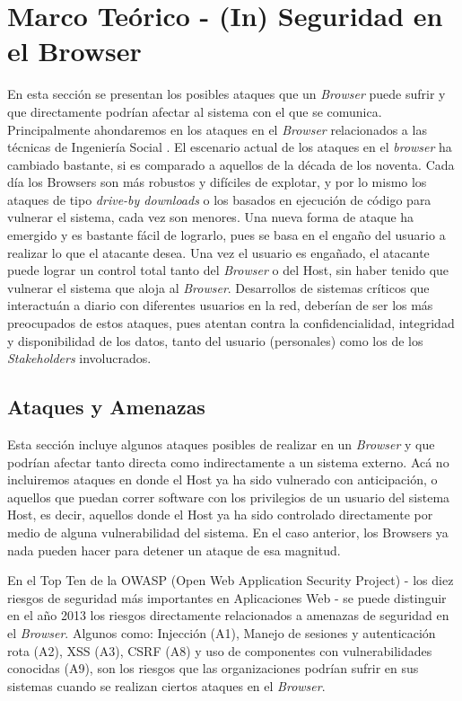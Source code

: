 \chapter{Marco Teórico - (In) Seguridad en el Browser}
\label{chap3:MT}


En esta sección se presentan los posibles ataques que un \textit{Browser} puede sufrir y que directamente podrían afectar al sistema con el que se comunica. Principalmente ahondaremos en los ataques en el \textit{Browser} relacionados a las técnicas de Ingeniería Social \cite{socEngineeering}. El escenario actual de los ataques en el \textit{browser} ha cambiado bastante, si es comparado a aquellos de la década de los noventa. Cada día los Browsers son más robustos y difíciles de explotar, y por lo mismo los ataques de tipo \textit{drive-by downloads} o los basados en ejecución de código para vulnerar el sistema, cada vez son menores. Una nueva forma de ataque ha emergido y es bastante fácil de lograrlo, pues se basa en el engaño del usuario a realizar lo que el atacante desea. Una vez el usuario es engañado, el atacante puede lograr un control total tanto del \textit{Browser} o del Host, sin haber tenido que vulnerar el sistema \cite{Rajab2013,Labs2013} que aloja al \textit{Browser}. Desarrollos de sistemas críticos que interactuán a diario con diferentes usuarios en la red, deberían de ser los más preocupados de estos ataques, pues atentan contra la confidencialidad, integridad y disponibilidad de los datos, tanto del usuario (personales) como los de los \textit{Stakeholders} involucrados.

\section{Ataques y Amenazas}
Esta sección incluye algunos ataques posibles de realizar en un \textit{Browser} y que podrían afectar tanto directa como indirectamente a un sistema externo. Acá no incluiremos ataques en donde el Host ya ha sido vulnerado con anticipación, o aquellos que puedan correr software con los privilegios de un usuario del sistema Host, es decir, aquellos donde el Host ya ha sido controlado directamente por medio de alguna vulnerabilidad del sistema. En el caso anterior, los Browsers ya nada pueden hacer para detener un ataque de esa magnitud.

En el Top Ten \cite{owaspTopTen} de la OWASP (Open Web Application Security Project) - los diez riesgos de seguridad más importantes en Aplicaciones Web - se puede distinguir en el año 2013 los riesgos directamente relacionados a amenazas de seguridad en el \textit{Browser}. Algunos como: Injección (A1), Manejo de sesiones y autenticación rota (A2), XSS (A3), CSRF (A8) y uso de componentes con vulnerabilidades conocidas (A9), son los riesgos que las organizaciones podrían sufrir en sus sistemas cuando se realizan ciertos ataques en el \textit{Browser}.

